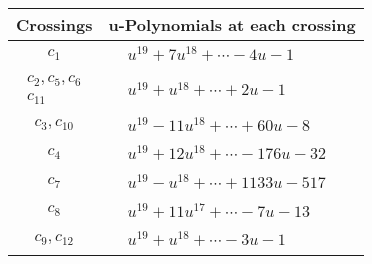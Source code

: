 \documentclass[1p]{elsarticle_modified}
\theoremstyle{definition}
\begin{document}
\begin{tabular}{m{50pt}|m{274pt}}
Crossings & \hspace{64pt}u-Polynomials at each crossing \\
\hline $$\begin{aligned}c_{1}\end{aligned}$$&$\begin{aligned}
&u^{19}+7 u^{18}+\cdots-4 u-1
\end{aligned}$\\
\hline $$\begin{aligned}c_{2},c_{5},c_{6}\\c_{11}\end{aligned}$$&$\begin{aligned}
&u^{19}+u^{18}+\cdots+2 u-1
\end{aligned}$\\
\hline $$\begin{aligned}c_{3},c_{10}\end{aligned}$$&$\begin{aligned}
&u^{19}-11 u^{18}+\cdots+60 u-8
\end{aligned}$\\
\hline $$\begin{aligned}c_{4}\end{aligned}$$&$\begin{aligned}
&u^{19}+12 u^{18}+\cdots-176 u-32
\end{aligned}$\\
\hline $$\begin{aligned}c_{7}\end{aligned}$$&$\begin{aligned}
&u^{19}- u^{18}+\cdots+1133 u-517
\end{aligned}$\\
\hline $$\begin{aligned}c_{8}\end{aligned}$$&$\begin{aligned}
&u^{19}+11 u^{17}+\cdots-7 u-13
\end{aligned}$\\
\hline $$\begin{aligned}c_{9},c_{12}\end{aligned}$$&$\begin{aligned}
&u^{19}+u^{18}+\cdots-3 u-1
\end{aligned}$\\
\hline
\end{tabular}\\~\\
\end{document}
